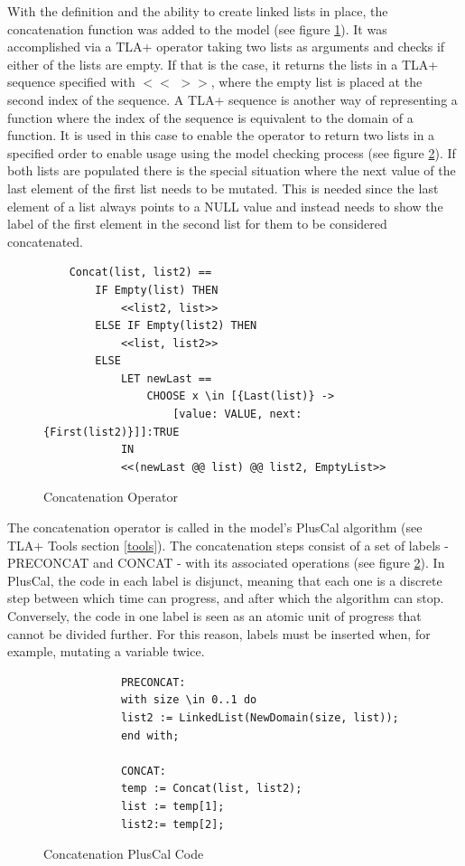 With the definition and the ability to create linked lists in place, the concatenation function was added to the model (see figure \ref{fig:concatenation}). It was accomplished via a TLA+ operator taking two lists as arguments and checks if either of the lists are empty. If that is the case, it returns the lists in a TLA+ sequence specified with $<$$<$ $>$$>$, where the empty list is placed at the second index of the sequence. A TLA+ sequence is another way of representing a function where the index of the sequence is equivalent to the domain of a function. It is used in this case to enable the operator to return two lists in a specified order to enable usage using the model checking process (see figure \ref{fig:pluscalconcat}). If both lists are populated there is the special situation where the next value of the last element of the first list needs to be mutated. This is needed since the last element of a list always points to a NULL value and instead needs to show the label of the first element in the second list for them to be considered concatenated.

\begin{figure}[H]
 \vspace{12pt}
\begin{verbatim}
    Concat(list, list2) ==
        IF Empty(list) THEN
            <<list2, list>>
        ELSE IF Empty(list2) THEN
            <<list, list2>>
        ELSE
            LET newLast ==
                CHOOSE x \in [{Last(list)} -> 
                    [value: VALUE, next: {First(list2)}]]:TRUE
            IN
            <<(newLast @@ list) @@ list2, EmptyList>>
\end{verbatim}
    \caption{Concatenation Operator}
    \label{fig:concatenation}
\end{figure}

The concatenation operator is called in the model’s PlusCal algorithm (see TLA+ Tools section \ref{tools}). The concatenation steps consist of a set of labels - PRECONCAT and CONCAT -  with its associated operations (see figure \ref{fig:pluscalconcat}). In PlusCal, the code in each label is disjunct, meaning that each one is a discrete step between which time can progress, and after which the algorithm can stop. Conversely, the code in one label is seen as an atomic unit of progress that cannot be divided further. For this reason, labels must be inserted when, for example, mutating a variable twice. 

\begin{figure}[H]
 \vspace{12pt}
\begin{verbatim}
            PRECONCAT:
            with size \in 0..1 do
            list2 := LinkedList(NewDomain(size, list));
            end with;            
                    
            CONCAT:  
            temp := Concat(list, list2);
            list := temp[1];
            list2:= temp[2];
\end{verbatim} 
    \caption{Concatenation PlusCal Code}
    \label{fig:pluscalconcat}
\end{figure}

